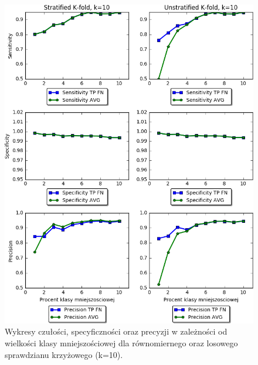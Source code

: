 \begin{figure}[H]
	\centering
	\includegraphics[width=\textwidth]{./images/wsk.png}
	\caption{Wykresy czułości, specyficzności oraz precyzji w zależności od wielkości klasy mniejszościowej dla równomiernego oraz losowego sprawdzianu krzyżowego (k=10).}
	\label{fig:wskazniki}
\end{figure}

